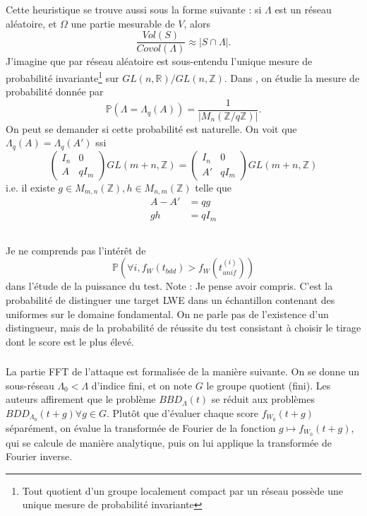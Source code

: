 \documentclass{article}
\begin{document}
Cette heuristique se trouve aussi sous la forme suivante : si $\Lambda$ est un réseau aléatoire, et $\Omega$ une partie mesurable de $V$, alors 
\[\frac{Vol(S)}{Covol(\Lambda)} \approx |S\cap \Lambda|.\]
J'imagine que par réseau aléatoire est sous-entendu l'unique mesure de probabilité invariante\footnote{Tout quotient d'un groupe localement compact par un réseau possède une unique mesure de probabilité invariante} sur $GL(n,\mathbb R) / GL(n,\mathbb Z)$. Dans \cite{Shen}, on étudie la mesure de probabilité donnée par 
\[\mathbb P(\Lambda = \Lambda_q (A) ) = \frac{1}{|M_n(\mathbb Z / q\mathbb Z)|}.\]
On peut se demander si cette probabilité est naturelle. On voit que $\Lambda_q(A) = \Lambda_q(A')$ ssi 
\[\begin{pmatrix} I_n & 0 \\ A & qI_m \end{pmatrix} GL(m+n,\mathbb Z) = \begin{pmatrix} I_n & 0 \\ A' & qI_m \end{pmatrix}GL(m+n,\mathbb Z)\]
i.e. il existe $g\in M_{m,n}(\mathbb Z), h \in M_{n,m}(\mathbb Z)$ telle que 
\[\begin{split} 
A-A' & = qg \\
gh   & = qI_m \\
\end{split}\]	 

 
\subsubsection{}

Je ne comprends pas l'intérêt de
$$\mathbb P( \forall i , f_W(t_{bdd}) > f_W(t^{(i)}_{unif}) )   $$
dans l'étude de la puissance du test. Note : Je pense avoir compris. C'est la probabilité de distinguer une target LWE dans un échantillon contenant des uniformes sur le domaine fondamental. On ne parle pas de l'existence d'un distingueur, mais de la probabilité de réussite du test consistant à choisir le tirage dont le score est le plus élevé.

\subsubsection{}

La partie FFT de l'attaque est formalisée de la manière suivante. On se donne un sous-réseau $\Lambda_0 < \Lambda $ d'indice fini, et on note $G$ le groupe quotient (fini). Les auteurs affirement que le problème $BBD_{\Lambda}(t)$ se réduit aux problèmes $BDD_{\Lambda_0}(t+g) \forall g \in G$. Plutôt que d'évaluer chaque score $f_{W_0}(t+g)$ séparément, on évalue la transformée de Fourier de la fonction $g \mapsto  f_{W_0}(t+g)$, qui se calcule de manière analytique, puis on lui applique la transformée de Fourier inverse.
\end{document}
